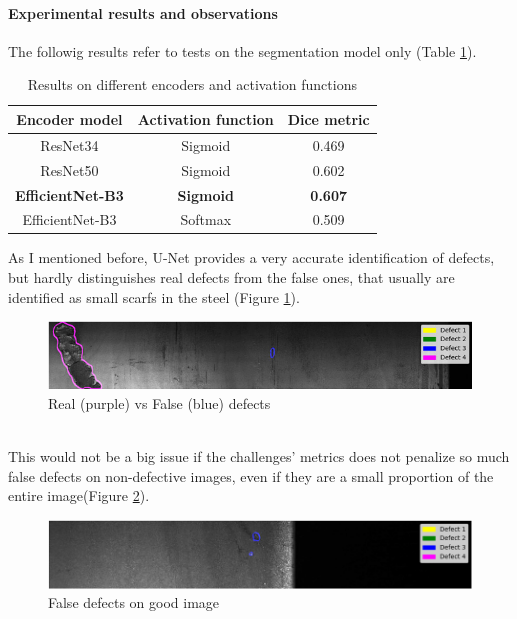\documentclass[10pt,twocolumn,letterpaper]{article}
\begin{document}
      \paragraph{Experimental results and observations}
         The followig results refer to tests on the segmentation model only (Table \ref{table:res_encoders}).
         \begin{table}[h]
            \centering
            \begin{tabular}{||c c c||} 
            \hline
            Encoder model & Activation function & Dice metric\\ [0.4ex] 
            \hline\hline
            ResNet34 & Sigmoid & 0.469 \\ 
            \hline
            ResNet50 & Sigmoid & 0.602 \\
            \hline
            \textbf{EfficientNet-B3} & \textbf{Sigmoid} & \textbf{0.607} \\
            \hline
            EfficientNet-B3 & Softmax & 0.509 \\
            \hline
            \end{tabular}
            \caption{Results on different encoders and activation functions}
            \label{table:res_encoders}
         \end{table}

         As I mentioned before, U-Net provides a very accurate identification of defects, but hardly distinguishes real defects from the false ones, that usually are identified as small scarfs in the steel (Figure \ref{fig:result1}). 
         \begin{figure}[h]
            \centering
            \caption{Real (purple) vs False (blue) defects} \label{fig:result1}
            \includegraphics[scale=0.5]{Img_Result1.png}
         \end{figure}
         \\This would not be a big issue if the challenges' metrics does not penalize so much false defects on non-defective images, even if they are a small proportion of the entire image(Figure \ref{fig:result2}).  
         \begin{figure}[h]
            \centering
            \caption{False defects on good image} \label{fig:result2}
            \includegraphics[scale=0.355]{Img_Result2.png}
         \end{figure}
   
\end{document}
